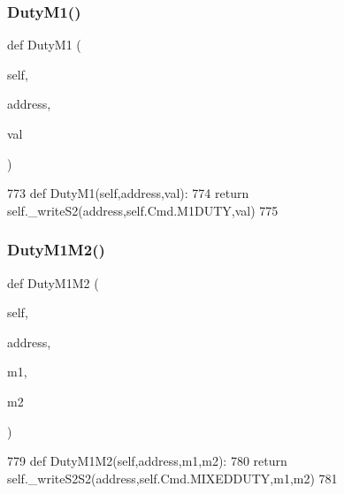 \subsubsection{\texorpdfstring{Duty\+M1()}{DutyM1()}}
{\footnotesize\ttfamily def Duty\+M1 (\begin{DoxyParamCaption}\item[{}]{self,  }\item[{}]{address,  }\item[{}]{val }\end{DoxyParamCaption})}


\begin{DoxyCode}
773     \textcolor{keyword}{def }DutyM1(self,address,val):
774         \textcolor{keywordflow}{return} self.\_writeS2(address,self.Cmd.M1DUTY,val)
775 
\end{DoxyCode}
\mbox{\label{classtoxic__hardware_1_1roboclaw__3_1_1Roboclaw_a3f7c1baa59d28bf69d9beb6a83deab5f}} 
\subsubsection{\texorpdfstring{Duty\+M1\+M2()}{DutyM1M2()}}
{\footnotesize\ttfamily def Duty\+M1\+M2 (\begin{DoxyParamCaption}\item[{}]{self,  }\item[{}]{address,  }\item[{}]{m1,  }\item[{}]{m2 }\end{DoxyParamCaption})}


\begin{DoxyCode}
779     \textcolor{keyword}{def }DutyM1M2(self,address,m1,m2):
780         \textcolor{keywordflow}{return} self.\_writeS2S2(address,self.Cmd.MIXEDDUTY,m1,m2)
781 
\end{DoxyCode}
\mbox{\label{classtoxic__hardware_1_1roboclaw__3_1_1Roboclaw_a99a7bb8b0e944f465bbeb1b6722ef22c}} 
